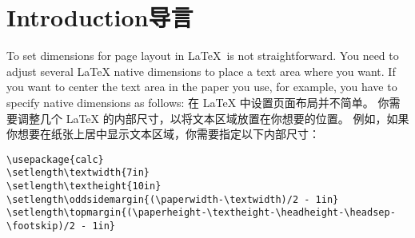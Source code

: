 \section{Introduction\hfill 导言}

\begin{paracol}{2}
To set dimensions for page layout in \LaTeX\ is not straightforward. 
You need to adjust several \LaTeX{} native dimensions to place a text area
where you want.
If you want to center the text area in the paper you use, for example, 
you have to specify native dimensions as follows:
\switchcolumn 
在 {\LaTeX} 中设置页面布局并不简单。
你需要调整几个 {\LaTeX} 的内部尺寸，以将文本区域放置在你想要的位置。
例如，如果你想要在纸张上居中显示文本区域，你需要指定以下内部尺寸：
\end{paracol}
\begin{verbatim}
\usepackage{calc}
\setlength\textwidth{7in}
\setlength\textheight{10in}
\setlength\oddsidemargin{(\paperwidth-\textwidth)/2 - 1in}
\setlength\topmargin{(\paperheight-\textheight-\headheight-\headsep-\footskip)/2 - 1in}
\end{verbatim}


